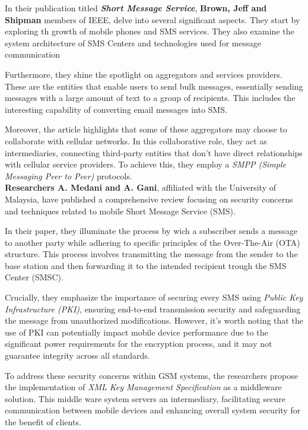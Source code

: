 \documentclass[12pt,a4paper]{report}
\begin{document}
	\cite{brown2007sms} In their publication titled \textbf{\textit{Short Message Service}}, \textbf{Brown, Jeff and Shipman} members of IEEE, delve into several significant aspects. They start by exploring th growth of mobile phones and SMS services. They also examine the system architecture of SMS Centers and technologies used for message communication
	
	Furthermore, they shine the spotlight on aggregators and services providers. These are the entities that enable users to send bulk messages, essentially sending messages with a large amount of text to a group of recipients. This includes the interesting capability of converting email messages into SMS.
	
	Moreover, the article highlights that some of these aggregators may choose to collaborate with cellular networks. In this collaborative role, they act as intermediaries, connecting third-party entities that don't have direct relationships with cellular service providers. To achieve this, they employ a \textit{SMPP (Simple Messaging Peer to Peer)} protocols.\\
	
	\cite{medani2011review} \textbf{Researchers A. Medani and A. Gani}, affiliated with the University of Malaysia, have published a comprehensive review focusing on security concerns and techniques related to mobile Short Message Service (SMS).
	
	In their paper, they illuminate the process by wich a subscriber sends a message to another party while adhering to specific principles of the Over-The-Air (OTA) structure. This process involves transmitting the message from the sender to the base station and then forwarding it to the intended recipient trough the SMS Center (SMSC).
	
	Crucially, they emphasize the importance of securing every SMS using \textit{Public Key Infrastructure (PKI)}, ensuring end-to-end transmission security and safeguarding the message from unauthorized modifications. However, it's worth noting that the use of PKI can potentially impact mobile device performance due to the significant power requirements for the encryption process, and it may not guarantee integrity across all standards.
	
	To address these security concerns within GSM systems, the researchers propose the implementation of \textit{XML Key Management Specification} as a middleware solution. This middle ware system servers an intermediary, facilitating secure communication between mobile devices and enhancing overall system security for the benefit of clients.\\
	
\end{document}
